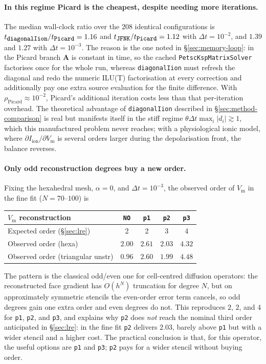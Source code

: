 \documentclass[11pt,a4paper]{article}
\newcommand{\code}[1]{\texttt{\small #1}}
\newcommand{\Vm}{V_{\text{m}}}
\newcommand{\Iion}{I_{\mathrm{ion}}}
\newcommand{\Aimp}{\mathbf{A}}
\begin{document}
\paragraph{In this regime Picard is the cheapest, despite needing more
iterations.}
The median wall-clock ratio over the $208$ identical configurations is
$t_{\code{diagonalIion}}/t_{\code{Picard}}=1.16$ and
$t_{\code{JFNK}}/t_{\code{Picard}}=1.12$ with $\Delta t=10^{-2}$, and $1.39$ and
$1.27$ with $\Delta t=10^{-3}$. The reason is the one noted in
\S\ref{sec:memory-loop}: in the Picard branch $\Aimp$ is constant in time, so the
cached \code{PetscKspMatrixSolver} factorises once for the whole run, whereas
\code{diagonalIion} must refresh the diagonal and redo the numeric ILU(T)
factorisation at every correction and additionally pay one extra source
evaluation for the finite difference. With
$\rho_{\text{Picard}}\approx10^{-2}$, Picard's additional iteration costs less
than that per-iteration overhead. The theoretical advantage of
\code{diagonalIion} described in \S\ref{sec:method-comparison} is real but
manifests itself in the stiff regime $\theta\Delta t\max_i|d_i|\gtrsim1$, which
this manufactured problem never reaches; with a physiological ionic model, where
$\partial\Iion/\partial\Vm$ is several orders larger during the depolarisation
front, the balance reverses.

\paragraph{Only odd reconstruction degrees buy a new order.}
Fixing the hexahedral mesh, $\alpha=0$, and $\Delta t=10^{-3}$, the observed
order of $\Vm$ in the fine fit ($N=70$--$100$) is
\begin{center}
\begin{tabular}{@{}lcccc@{}}
\toprule
$\Vm$ reconstruction & \code{NO} & \code{p1} & \code{p2} & \code{p3} \\
\midrule
Expected order (\S\ref{sec:lre}) & 2 & 2 & 3 & 4 \\
Observed order (hexa) & $2.00$ & $2.61$ & $2.03$ & $4.32$ \\
Observed order (triangular unstr) & $0.96$ & $2.60$ & $1.99$ & $4.48$ \\
\bottomrule
\end{tabular}
\end{center}
The pattern is the classical odd/even one for cell-centred diffusion operators:
the reconstructed face gradient has $O(h^{N})$ truncation for degree $N$, but on
approximately symmetric stencils the even-order error term cancels, so odd
degrees gain one extra order and even degrees do not. This reproduces $2$, $2$,
and $4$ for \code{p1}, \code{p2}, and \code{p3}, and explains why \code{p2} does
\emph{not} reach the nominal third order anticipated in \S\ref{sec:lre}: in the
fine fit \code{p2} delivers $2.03$, barely above \code{p1} but with a wider
stencil and a higher cost. The practical conclusion is that, for this operator,
the useful options are \code{p1} and \code{p3}; \code{p2} pays for a wider
stencil without buying order.
\end{document}
